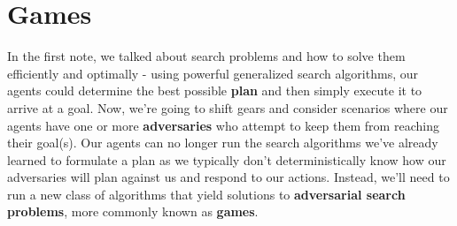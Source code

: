 \documentclass[11pt,fleqn]{article}
\def\title{Note \the\lecturenumber}
\begin{document}
\maketitle

\section*{Games}
In the first note, we talked about search problems and how to solve them efficiently and optimally - using powerful generalized search algorithms, our agents could determine the best possible \textbf{plan} and then simply execute it to arrive at a goal. Now, we're going to shift gears and consider scenarios where our agents have one or more \textbf{adversaries} who attempt to keep them from reaching their goal(s). Our agents can no longer run the search algorithms we've already learned to formulate a plan as we typically don't deterministically know how our adversaries will plan against us and respond to our actions. Instead, we'll need to run a new class of algorithms that yield solutions to \textbf{adversarial search problems}, more commonly known as \textbf{games}.


\end{document}
\end{document}
